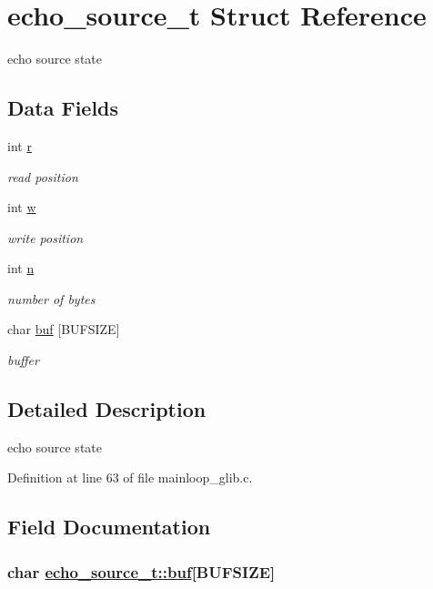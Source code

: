 \hypertarget{structecho__source__t}{
\section{echo\_\-source\_\-t Struct Reference}
\label{structecho__source__t}
}
echo source state  


\subsection*{Data Fields}
\begin{CompactItemize}
\item 
int \hyperlink{structecho__source__t_o0}{r}
\begin{CompactList}\small\item\em read position \item\end{CompactList}\item 
int \hyperlink{structecho__source__t_o1}{w}
\begin{CompactList}\small\item\em write position \item\end{CompactList}\item 
int \hyperlink{structecho__source__t_o2}{n}
\begin{CompactList}\small\item\em number of bytes \item\end{CompactList}\item 
char \hyperlink{structecho__source__t_o3}{buf} \mbox{[}BUFSIZE\mbox{]}
\begin{CompactList}\small\item\em buffer \item\end{CompactList}\end{CompactItemize}


\subsection{Detailed Description}
echo source state 



Definition at line 63 of file mainloop\_\-glib.c.

\subsection{Field Documentation}
\hypertarget{structecho__source__t_o3}{
\subsubsection[buf]{\setlength{\rightskip}{0pt plus 5cm}char \hyperlink{structecho__source__t_o3}{echo\_\-source\_\-t::buf}\mbox{[}BUFSIZE\mbox{]}}}
\label{structecho__source__t_o3}


